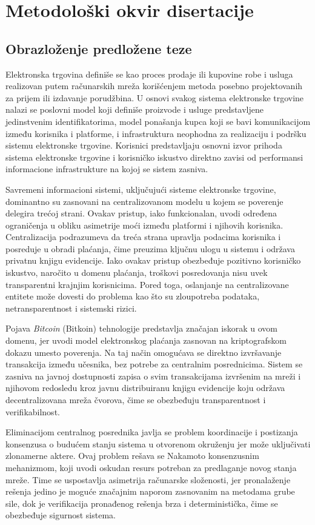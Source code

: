 \chapter{Metodološki okvir disertacije}

\section{Obrazloženje predložene teze}
Elektronska trgovina definiše se kao proces prodaje ili kupovine robe i usluga realizovan putem računarskih mreža korišćenjem metoda posebno projektovanih za prijem ili izdavanje porudžbina. U osnovi svakog sistema elektronske trgovine nalazi se poslovni model koji definiše proizvode i usluge predstavljene jedinstvenim identifikatorima, model ponašanja kupca koji se bavi komunikacijom između korisnika i platforme, i infrastruktura neophodna za realizaciju i podršku sistemu elektronske trgovine. Korisnici predstavljaju osnovni izvor prihoda sistema elektronske trgovine i korisničko iskustvo direktno zavisi od performansi informacione infrastrukture na kojoj se sistem zasniva.

Savremeni informacioni sistemi, uključujući sisteme elektronske trgovine, dominantno su zasnovani na centralizovanom modelu u kojem se poverenje delegira trećoj strani. Ovakav pristup, iako funkcionalan, uvodi određena ograničenja u obliku asimetrije moći između platformi i njihovih korisnika. Centralizacija podrazumeva da treća strana upravlja podacima korisnika i posreduje u obradi plaćanja, čime preuzima ključnu ulogu u sistemu i održava privatnu knjigu evidencije. Iako ovakav pristup obezbeđuje pozitivno korisničko iskustvo, naročito u domenu plaćanja, troškovi posredovanja nisu uvek transparentni krajnjim korisnicima. Pored toga, oslanjanje na centralizovane entitete može dovesti do problema kao što su zloupotreba podataka, netransparentnost i sistemski rizici.

Pojava \textit{Bitcoin} (Bitkoin) tehnologije predstavlja značajan iskorak u ovom domenu, jer uvodi model elektronskog plaćanja zasnovan na kriptografskom dokazu umesto poverenja. Na taj način omogućava se direktno izvršavanje transakcija između učesnika, bez potrebe za centralnim posrednicima. Sistem se zasniva na javnoj dostupnosti zapisa o svim transakcijama izvršenim na mreži i njihovom redosledu kroz javnu distribuiranu knjigu evidencije koju održava decentralizovana mreža čvorova, čime se obezbeđuju transparentnost i verifikabilnost.

Eliminacijom centralnog posrednika javlja se problem koordinacije i postizanja konsenzusa o budućem stanju sistema u otvorenom okruženju jer može uključivati zlonamerne aktere. Ovaj problem rešava se Nakamoto konsenzusnim mehanizmom, koji uvodi oskudan resurs potreban za predlaganje novog stanja mreže. Time se uspostavlja asimetrija računarske složenosti, jer pronalaženje rešenja jedino je moguće značajnim naporom zasnovanim na metodama grube sile, dok je verifikacija pronađenog rešenja brza i deterministička, čime se obezbeđuje sigurnost sistema.

